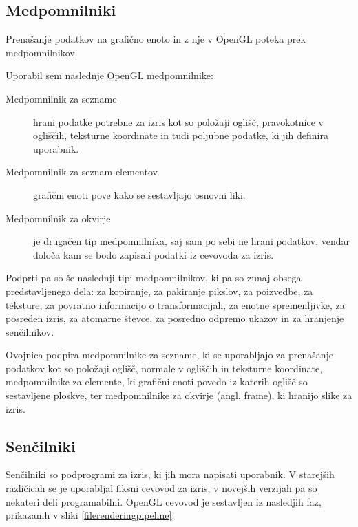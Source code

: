 \documentclass[a4paper, 12pt]{book}
\begin{document}
\subsection{Medpomnilniki}

Prenašanje podatkov na grafično enoto in z nje v OpenGL poteka prek medpomnilnikov. 

Uporabil sem naslednje OpenGL medpomnilnike:
\begin{description}

\item [Medpomnilnik za sezname] hrani podatke potrebne za izris kot so položaji oglišč, pravokotnice v ogliščih, teksturne koordinate in tudi poljubne podatke, ki jih definira uporabnik.

\item [Medpomnilnik za seznam elementov] grafični enoti pove kako se sestavljajo osnovni liki.

\item [Medpomnilnik za okvirje] je drugačen tip medpomnilnika, saj sam po sebi ne hrani podatkov, vendar določa kam se bodo zapisali podatki iz cevovoda za izris.

\end{description}
Podprti pa so še naslednji tipi medpomnilnikov, ki pa so zunaj obsega predstavljenega dela: za kopiranje, za pakiranje pikslov, za poizvedbe, za teksture, za povratno informacijo o transformacijah, za enotne spremenljivke, za posreden izris, za atomarne števce, za posredno odpremo ukazov in za hranjenje senčilnikov.


Ovojnica podpira medpomnilnike za sezname, ki se uporabljajo za prenašanje podatkov kot so položaji oglišč, normale v ogliščih in teksturne koordinate, medpomnilnike za elemente, ki grafični enoti povedo iz katerih oglišč so sestavljene ploskve, ter medpomnilnike za okvirje (angl. frame), ki hranijo slike za izris.

\subsection{Senčilniki}

Senčilniki so podprogrami za izris, ki jih mora napisati uporabnik. V starejših različicah se je uporabljal fiksni cevovod za izris, v novejših verzijah pa so nekateri deli programabilni. OpenGL cevovod je sestavljen iz nasledjih faz, prikazanih v sliki \ref{filerenderingpipeline}:
\end{document}
